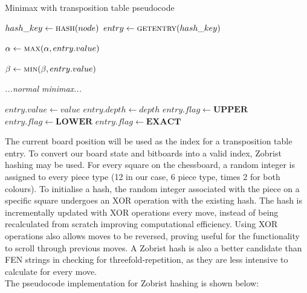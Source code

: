 \documentclass[../main/main.tex]{subfiles}
\begin{document}
\begin{algorithm}[H]
\caption{Minimax with transposition table pseudocode}
\begin{algorithmic}
        \State $hash\_key \gets \Call{hash}{node}$
        \State $entry \gets \Call{getentry}{hash\_key}$

        \bigskip

                \State {}
                \State $\alpha \gets \Call{max}{\alpha, entry.value}$

                \State $\beta \gets \Call{min}{\beta, entry.value}$
            \EndIf

            \If{$\alpha\geq\beta$}
                \State {}
            \EndIf
        \EndIf

        \bigskip

        \textit{...normal minimax...}

        \bigskip

        \State $entry.value \gets value$
        \State $entry.depth \gets depth$
            \State $entry.flag \gets \textbf{UPPER}$
            \State $entry.flag \gets \textbf{LOWER}$
        \Else
            \State $entry.flag \gets \textbf{EXACT}$
        \EndIf

        \bigskip

    \EndFunction
\end{algorithmic}
\end{algorithm}

The current board position will be used as the index for a transposition table entry. To convert our board state and bitboards into a valid index, Zobrist hashing may be used. For every square on the chessboard, a random integer is assigned to every piece type (12 in our case, 6 piece type, times 2 for both colours). To initialise a hash, the random integer associated with the piece on a specific square undergoes an XOR operation with the existing hash. The hash is incrementally updated with XOR operations every move, instead of being recalculated from scratch improving computational efficiency. Using XOR operations also allows moves to be reversed, proving useful for the functionality to scroll through previous moves. A Zobrist hash is also a better candidate than FEN strings in checking for threefold-repetition, as they are less intensive to calculate for every move.
\\
The pseudocode implementation for Zobrist hashing is shown below:
\end{document}
